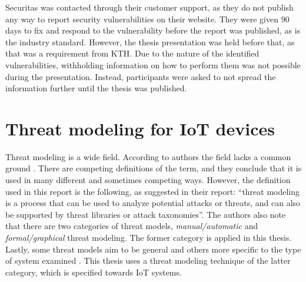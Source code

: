 Securitas was contacted through their customer support, as they do not publish any way to report security vulnerabilities on their website. They were given 90 days to fix and respond to the vulnerability before the report was published, as is the industry standard. However, the thesis presentation was held before that, as that was a requirement from KTH. Due to the nature of the identified vulnerabilities, withholding information on how to perform them was not possible during the presentation. Instead, participants were asked to not spread the information further until the thesis was published.

\section{Threat modeling for IoT devices} \label{ch:method:threat-modeling}
Threat modeling is a wide field. According to authors \citeauthor{XIONG201953} the field lacks a common ground \cite{XIONG201953}. There are competing definitions of the term, and they conclude that it is used in many different and sometimes competing ways. However, the definition used in this report is the following, as suggested in their report: \enquote{threat modeling is a process that can be used to analyze potential attacks or threats, and can also be supported by threat libraries or attack taxonomies}. The authors also note that there are two categories of threat models, \textit{manual/automatic} and \textit{formal/graphical} threat modeling. The former category is applied in this thesis. Lastly, some threat models aim to be general and others more specific to the type of system examined \citeauthor{XIONG201953}. This thesis uses a threat modeling technique of the latter category, which is specified towards IoT systems.

